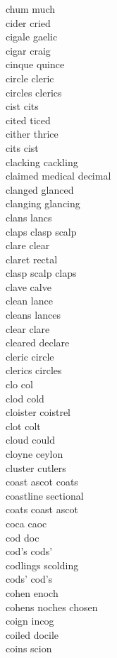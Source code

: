 chum much\\
cider cried\\
cigale gaelic\\
cigar craig\\
cinque quince\\
circle cleric\\
circles clerics\\
cist cits\\
cited ticed\\
cither thrice\\
cits cist\\
clacking cackling\\
claimed medical decimal\\
clanged glanced\\
clanging glancing\\
clans lancs\\
claps clasp scalp\\
clare clear\\
claret rectal\\
clasp scalp claps\\
clave calve\\
clean lance\\
cleans lances\\
clear clare\\
cleared declare\\
cleric circle\\
clerics circles\\
clo col\\
clod cold\\
cloister coistrel\\
clot colt\\
cloud could\\
cloyne ceylon\\
cluster cutlers\\
coast ascot coats\\
coastline sectional\\
coats coast ascot\\
coca caoc\\
cod doc\\
cod's cods'\\
codlings scolding\\
cods' cod's\\
cohen enoch\\
cohens noches chosen\\
coign incog\\
coiled docile\\
coins scion\\
